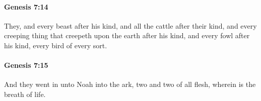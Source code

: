 		\paragraph{Genesis 7:14} %
			\label{GENESIS-7-14}

			They, and every beast after his kind, and all the cattle after their kind, and every creeping thing that creepeth upon the earth after his kind, and every fowl after his kind, every bird of every sort.


		\paragraph{Genesis 7:15} %
			\label{GENESIS-7-15}

			And they went in unto Noah into the ark, two and two of all flesh, wherein is the breath of life.



